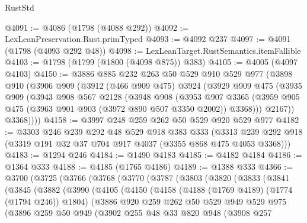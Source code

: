 \begin{lexlean}{RustStd}
\begin{coremodule}
{\begin{coremodule}
{{{{{{{{{{{{@4091 := @4086 (@1798 (@4088 @292))
@4092 := LexLeanPreservation.Rust.primTyped
@4093 := @4092 @237
@4097 := @4091 (@1798 (@4093 @292 @48))
@4098 := LexLeanTarget.RustSemantics.itemFallible
@4103 := @1798 (@1799 (@1800 (@4098 @875)) @383)
@4105 := @4005 (@4097 @4103)
@4150 := @3886
    @885
    @232
    @263
    @50
    @529
    @910
    @529
    @977
    (@3898
      @910
      (@3906
        @909
        (@3912
          (@466 @909 @475)
          @3924
          (@3929
            @909
            @475
            (@3935
              @909
              (@3943
                @908
                @567
                @2128
                (@3948
                  @908
                  (@3953
                    @907
                    @3365
                    (@3959 @905 @475 (@3963 @901 @903 (@3972 @890 @507 @3350 @2002)) @3368)))
                @2167))
            @3368))))
@4158 := @3997 @248 @259 @262 @50 @529 @920 @529 @977
@4182 := @3303
    @246
    @239
    @292
    @48
    @529
    @918
    @383
    @333
    (@3313 @239 @292 @918 (@3319 @191 @32 @37 @704 @917 @4037 (@3355 @868 @475 @4053 @3368)))
@4183 := @1294 @246
@4184 := @1490 @4183
@4185 := @4182 @4184
@4186 := @1364 @333
@4188 := @4185 (@1765 @4186)
@4189 := @1388 @333
@4366 := @3700
    (@3725
      (@3766
        (@3768
          (@3770
            (@3787
              (@3803
                (@3820
                  (@3833
                    (@3841
                      (@3845
                        (@3882
                          (@3990
                            (@4105
                              (@4150
                                (@4158
                                  (@4188 (@1769 @4189) (@1774 (@1794 @246)) @1804)
                                  (@3886
                                    @920
                                    @259
                                    @262
                                    @50
                                    @529
                                    @949
                                    @529
                                    @975
                                    (@3896
                                      @259
                                      @50
                                      @949
                                      (@3902
                                        @255
                                        @48
                                        @33
                                        @820
                                        @948
                                        (@3908
                                          @257
}}}}}}}}}}}}
\end{coremodule}}
\end{coremodule}
\end{lexlean}
